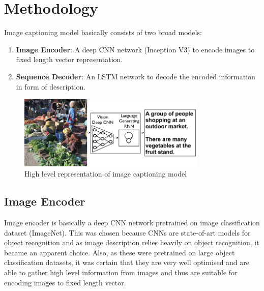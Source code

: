 \documentclass[11pt]{article}
\begin{document}
	\section{Methodology}
		Image captioning model basically consists of two broad models:
		\begin{enumerate}
		\item
			\textbf{Image Encoder}: A deep CNN network (Inception V3) to encode images to fixed length vector representation.
		\item
			\textbf{Sequence Decoder}: An LSTM network to decode the encoded information in form of description.
		\end{enumerate}
	
		\begin{figure}[ht!]
		\centering
		\includegraphics[width=0.8\textwidth]{model.png}
		\caption{High level representation of image captioning model}
		\centering
		\end{figure}
	
		\subsection{Image Encoder}
			Image encoder is basically a deep CNN network pretrained on image classification dataset (ImageNet). This was chosen because CNNs are state-of-art models for object recognition and as image description relies heavily on object recognition, it became an apparent choice. Also, as these were pretrained on large object classification datasets, it was certain that they are very well optimised and are able to gather high level information from images and thus are suitable for encoding images to fixed length vector.
\end{document}
